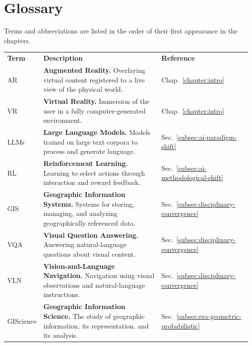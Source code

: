 \clearpage
\chapter*{Glossary}
\label{sec:glossary-glossary}

Terms and abbreviations are listed in the order of their first appearance in the chapters.


\begin{longtable}{lll}
	\textbf{Term} & \textbf{Description} & \textbf{Reference}\\

    AR & \textbf{Augmented Reality.} Overlaying virtual content registered to a live view of the physical world. & Chap.~\ref{chapter:intro} \\
    
    VR & \textbf{Virtual Reality.} Immersion of the user in a fully computer-generated environment. & Chap.~\ref{chapter:intro} \\
    
    LLMs & \textbf{Large Language Models.} Models trained on large text corpora to process and generate language. & Sec.~\ref{subsec:ai-paradigm-shift} \\
    
    RL & \textbf{Reinforcement Learning.} Learning to select actions through interaction and reward feedback. & Sec.~\ref{subsec:ai-methodological-shift} \\
    
    GIS & \textbf{Geographic Information Systems.} Systems for storing, managing, and analyzing geographically referenced data. & Sec.~\ref{subsec:disciplinary-convergence} \\
    
    VQA & \textbf{Visual Question Answering.} Answering natural-language questions about visual content. & Sec.~\ref{subsec:disciplinary-convergence} \\
    
    VLN & \textbf{Vision-and-Language Navigation.} Navigation using visual observations and natural-language instructions. & Sec.~\ref{subsec:disciplinary-convergence} \\
    
    GIScience & \textbf{Geographic Information Science.} The study of geographic information, its representation, and its analysis. & Sec.~\ref{subsec:era-geometric-probabilistic} \\
    

\end{longtable}
